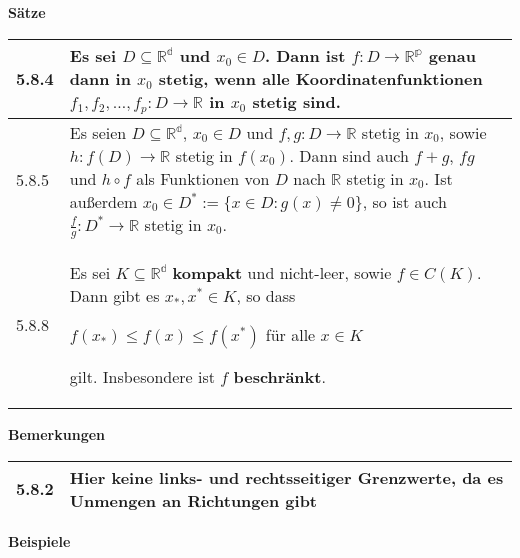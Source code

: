     \noindent 
    \textbf{Sätze}
    \begin{table}[H]
    \begin{tabularx}{\textwidth}{X m{16cm}}
        \toprule

        5.8.4 & Es sei $D \subseteq \mathbb{R^d}$ und $x_0 \in D$. Dann ist $f: D \rightarrow \mathbb{R^p}$ genau dann in $x_0$
                \textbf{stetig}, wenn alle Koordinatenfunktionen $f_1, f_2, \dots, f_p : D \rightarrow \mathbb{R}$ in $x_0$ stetig sind. \\
        \midrule
        5.8.5 &  Es seien $D \subseteq \mathbb{R^d}$, $x_0 \in D$ und $f,g : D \rightarrow \mathbb{R}$ stetig in $x_0$, sowie
                $h : f(D) \rightarrow \mathbb{R}$ stetig in $f(x_0)$. Dann sind auch $f+g$, $fg$ und $h \circ f$ als Funktionen
                von $D$ nach $\mathbb{R}$ stetig in $x_0$. \hfill \break
                Ist au\ss erdem $x_0 \in D^* := \{x \in D: g(x) \neq 0\}$, so ist auch $\frac{f}{g}:D^* \rightarrow \mathbb{R}$ stetig in $x_0$. \\
        \midrule
        5.8.8 & Es sei $K \subseteq \mathbb{R^d}$ \textbf{kompakt} und nicht-leer, sowie $f \in C(K)$. Dann gibt es $x_*, x^* \in K$, so dass \hfill \break
                \centerline{$f(x_*) \leq f(x) \leq f(x^*)$ für alle $x \in K$}
                gilt. Insbesondere ist $f$ \textbf{beschränkt}. \\
        \bottomrule
    \end{tabularx}
    \end{table}

    \noindent
    \textbf{Bemerkungen}
    \begin{table}[H]
    \begin{tabularx}{\textwidth}{X m{16cm}}
        \toprule

        5.8.2 & Hier keine links- und rechtsseitiger Grenzwerte, da es Unmengen an Richtungen gibt \\

        \bottomrule
    \end{tabularx}
    \end{table}

    \noindent
    \textbf{Beispiele}
    \begin{table}[h]
    \begin{tabularx}{\textwidth}{X m{16cm}}
        \toprule

        & \\

        \bottomrule
    \end{tabularx}
    \end{table}
